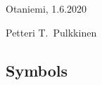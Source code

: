 \documentclass[english, 12pt, a4paper, elec, utf8, a-1b, online]{aaltothesis}
\begin{document}

\vspace{5cm}
Otaniemi, 1.6.2020

\vspace{5mm}
{\hfill Petteri T.\ Pulkkinen \hspace{1cm}}

\newpage

\thesistableofcontents



\subsection*{Symbols}
\end{document}
